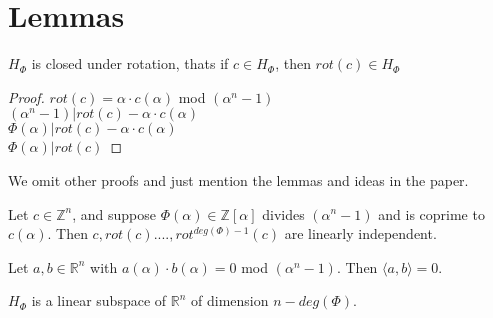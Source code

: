 \section{Lemmas}
\begin{lemma}
	$H_\Phi$ is closed under rotation, thats if $c \in H_\Phi$, then $rot(c) \in H_\Phi$
\end{lemma}
\begin{proof}
	{
		\centering
		$rot(c) = \alpha \cdot c(\alpha)$ mod $(\alpha^n - 1)$
		\\
		$(\alpha^n-1) | rot(c) - \alpha \cdot c(\alpha)$
		\\
		$\Phi(\alpha) | rot(c) - \alpha \cdot c(\alpha)$
		\\
		$\Phi(\alpha) | rot(c)$\par
	}
\end{proof}
We omit other proofs and just mention the lemmas and ideas in the paper.
\begin{lemma}
	Let $c \in \mathbb{Z}^n$, and suppose $\Phi(\alpha) \in \mathbb{Z}[\alpha]$ divides $(\alpha^n-1)$ and is coprime to $c(\alpha)$. Then $c, rot(c)....,rot^{deg(\Phi)-1}(c)$ are linearly independent.
\end{lemma}
\begin{lemma}
	Let $a,b \in \mathbb{R}^n$ with $a(\alpha) \cdot b(\alpha) = 0$ mod $(\alpha^n-1)$. Then $\langle a,b \rangle = 0$.
\end{lemma}
\begin{lemma}
	$H_\Phi$ is a linear subspace of $\mathbb{R}^n$ of dimension $n - deg(\Phi)$.
\end{lemma}